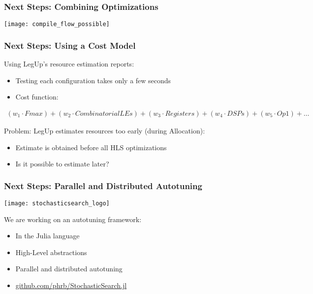 \documentclass[10pt, compress, aspectratio=169]{beamer}
\begin{document}
\begin{frame}
    \frametitle{Next Steps: Combining Optimizations}
    \begin{center}
        \texttt{[image: compile\_flow\_possible]}
    \end{center}
\end{frame}

\begin{frame}
    \frametitle{Next Steps: Using a Cost Model}
    Using LegUp’s \alert{resource estimation} reports:
    \begin{itemize}
        \item Testing each configuration takes \alert{only a few seconds}
        \item Cost function:
    \end{itemize}
    \begin{align*}
    (w_1 \cdot Fmax) + (w_2 \cdot CombinatorialLEs) + (w_3 \cdot Registers) + (w_4 \cdot DSPs) + (w_5 \cdot Op1) + \dots
    \end{align*}

    \alert{Problem}: LegUp estimates resources \alert{too early} (during Allocation):
    \begin{itemize}
        \item Estimate is obtained  \alert{before all HLS optimizations}
        \item Is it possible to estimate later?
    \end{itemize}
\end{frame}

\begin{frame}
    \frametitle{Next Steps: Parallel and Distributed Autotuning}
    \begin{center}
        \texttt{[image: stochasticsearch\_logo]}
    \end{center}

    We are working on an autotuning framework:
    \begin{itemize}
        \item In the \alert{Julia} language
        \item High-Level abstractions
        \item Parallel and distributed autotuning
        \item \url{github.com/phrb/StochasticSearch.jl}
    \end{itemize}
\end{frame}

\maketitle
\end{document}

